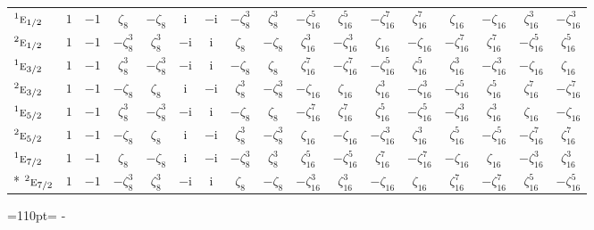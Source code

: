 \documentclass[10pt,a4paper]{article}
\newcommand{\needspace}[1]{\par\penalty-100\begingroup\dimen0=#1\relax\dimen2=\pagegoal
  \advance\dimen2-\pagetotal\ifdim\dimen0>\dimen2\relax\ifdim\dimen2>0pt\vfil\break\fi\fi
  \endgroup}
\numberwithin{equation}{section}
\newcommand{\irr}[1]{\text{\normalfont\scshape #1}}
\newcommand{\conjpair}[1]{{}^{#1}}
\newcommand{\iunit}{\mathrm{i}}
\newcommand{\rootunity}[1]{\zeta_{#1}}
\begin{document}
{\begin{longtable}{@{}lcccccccccccccccc@{}}
$\conjpair{1}\irr{e}_{1/2}$ & $1$ & $-1$ & $\rootunity{8}$ & $-\rootunity{8}$ & $\iunit{}$ & $-\iunit{}$ & $-\rootunity{8}^{3}$ & $\rootunity{8}^{3}$ & $-\rootunity{16}^{5}$ & $\rootunity{16}^{5}$ & $-\rootunity{16}^{7}$ & $\rootunity{16}^{7}$ & $\rootunity{16}$ & $-\rootunity{16}$ & $\rootunity{16}^{3}$ & $-\rootunity{16}^{3}$\\
$\conjpair{2}\irr{e}_{1/2}$ & $1$ & $-1$ & $-\rootunity{8}^{3}$ & $\rootunity{8}^{3}$ & $-\iunit{}$ & $\iunit{}$ & $\rootunity{8}$ & $-\rootunity{8}$ & $\rootunity{16}^{3}$ & $-\rootunity{16}^{3}$ & $\rootunity{16}$ & $-\rootunity{16}$ & $-\rootunity{16}^{7}$ & $\rootunity{16}^{7}$ & $-\rootunity{16}^{5}$ & $\rootunity{16}^{5}$\\
$\conjpair{1}\irr{e}_{3/2}$ & $1$ & $-1$ & $\rootunity{8}^{3}$ & $-\rootunity{8}^{3}$ & $-\iunit{}$ & $\iunit{}$ & $-\rootunity{8}$ & $\rootunity{8}$ & $\rootunity{16}^{7}$ & $-\rootunity{16}^{7}$ & $-\rootunity{16}^{5}$ & $\rootunity{16}^{5}$ & $\rootunity{16}^{3}$ & $-\rootunity{16}^{3}$ & $-\rootunity{16}$ & $\rootunity{16}$\\
$\conjpair{2}\irr{e}_{3/2}$ & $1$ & $-1$ & $-\rootunity{8}$ & $\rootunity{8}$ & $\iunit{}$ & $-\iunit{}$ & $\rootunity{8}^{3}$ & $-\rootunity{8}^{3}$ & $-\rootunity{16}$ & $\rootunity{16}$ & $\rootunity{16}^{3}$ & $-\rootunity{16}^{3}$ & $-\rootunity{16}^{5}$ & $\rootunity{16}^{5}$ & $\rootunity{16}^{7}$ & $-\rootunity{16}^{7}$\\
$\conjpair{1}\irr{e}_{5/2}$ & $1$ & $-1$ & $\rootunity{8}^{3}$ & $-\rootunity{8}^{3}$ & $-\iunit{}$ & $\iunit{}$ & $-\rootunity{8}$ & $\rootunity{8}$ & $-\rootunity{16}^{7}$ & $\rootunity{16}^{7}$ & $\rootunity{16}^{5}$ & $-\rootunity{16}^{5}$ & $-\rootunity{16}^{3}$ & $\rootunity{16}^{3}$ & $\rootunity{16}$ & $-\rootunity{16}$\\
$\conjpair{2}\irr{e}_{5/2}$ & $1$ & $-1$ & $-\rootunity{8}$ & $\rootunity{8}$ & $\iunit{}$ & $-\iunit{}$ & $\rootunity{8}^{3}$ & $-\rootunity{8}^{3}$ & $\rootunity{16}$ & $-\rootunity{16}$ & $-\rootunity{16}^{3}$ & $\rootunity{16}^{3}$ & $\rootunity{16}^{5}$ & $-\rootunity{16}^{5}$ & $-\rootunity{16}^{7}$ & $\rootunity{16}^{7}$\\
$\conjpair{1}\irr{e}_{7/2}$ & $1$ & $-1$ & $\rootunity{8}$ & $-\rootunity{8}$ & $\iunit{}$ & $-\iunit{}$ & $-\rootunity{8}^{3}$ & $\rootunity{8}^{3}$ & $\rootunity{16}^{5}$ & $-\rootunity{16}^{5}$ & $\rootunity{16}^{7}$ & $-\rootunity{16}^{7}$ & $-\rootunity{16}$ & $\rootunity{16}$ & $-\rootunity{16}^{3}$ & $\rootunity{16}^{3}$\\*
$\conjpair{2}\irr{e}_{7/2}$ & $1$ & $-1$ & $-\rootunity{8}^{3}$ & $\rootunity{8}^{3}$ & $-\iunit{}$ & $\iunit{}$ & $\rootunity{8}$ & $-\rootunity{8}$ & $-\rootunity{16}^{3}$ & $\rootunity{16}^{3}$ & $-\rootunity{16}$ & $\rootunity{16}$ & $\rootunity{16}^{7}$ & $-\rootunity{16}^{7}$ & $\rootunity{16}^{5}$ & $-\rootunity{16}^{5}$\\
\bottomrule\end{longtable}}
\needspace{110pt}
\end{document}
